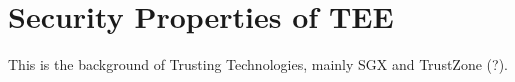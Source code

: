 \chapter{Security Properties of TEE}
\label{chp:background} 


This is the background of Trusting Technologies, mainly SGX and TrustZone (?).